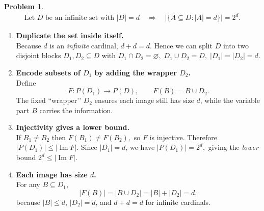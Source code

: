 \documentclass[12pt]{article}
\theoremstyle{definition} %
\newtheorem{problem}{Problem}
\theoremstyle{plain} %
\begin{document}
\begin{problem}
    \begin{align}
        \text{Let $D$ be an infinite set with } |D|=d
        \quad\Longrightarrow\quad
        \bigl|\{A\subseteq D:|A|=d\}\bigr| = 2^{d}.
    \end{align}

    \begin{enumerate}
        \item \textbf{Duplicate the set inside itself.}\\
              Because $d$ is an \emph{infinite} cardinal, 
              \(
                  d+d=d.
              \)
              Hence we can split $D$ into two disjoint blocks
              \(
                  D_{1},D_{2}\subseteq D
              \)
              with
              \(
                  D_{1}\cap D_{2}=\varnothing,
                  \;
                  D_{1}\cup D_{2}=D,
                  \;
                  |D_{1}|=|D_{2}|=d.
              \)

        \item \textbf{Encode subsets of $D_{1}$ by adding the wrapper $D_{2}$.}\\
              Define
              \[
                  F : P(D_{1}) \longrightarrow P(D),
                  \qquad
                  F(B)=B\cup D_{2}.
              \]
              The fixed “wrapper’’ $D_{2}$ ensures each image still has
              size $d$, while the variable part $B$ carries the information.

        \item \textbf{Injectivity gives a lower bound.}\\
              If $B_{1}\neq B_{2}$ then
              \(
                  F(B_{1})\neq F(B_{2}),
              \)
              so $F$ is injective.  
              Therefore
              \(
                  |P(D_{1})| \le |\operatorname{Im}F|.
              \)
              Since $|D_{1}|=d$, we have
              \(
                  |P(D_{1})| = 2^{d},
              \)
              giving the \emph{lower} bound
              \(
                  2^{d} \le |\operatorname{Im}F|.
              \)

        \item \textbf{Each image has size $d$.}\\
              For any $B\subseteq D_{1}$,
              \[
                  |F(B)|
                  =|B\cup D_{2}|
                  =|B|+|D_{2}|
                  =d,
              \]
              because $|B|\le d$, $|D_{2}|=d$, and $d+d=d$ for infinite
              cardinals.


\end{enumerate}
\end{problem}
\end{document}
